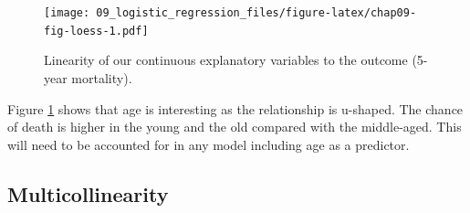 \documentclass[
  12pt,
  krantz2]{krantz}
\makeatletter
\newenvironment{Shaded}{\begin{snugshade}}{\end{snugshade}}
\newcommand{\DataTypeTok}[1]{\textcolor[rgb]{0.13,0.29,0.53}{#1}}
\newcommand{\DecValTok}[1]{\textcolor[rgb]{0.00,0.00,0.81}{#1}}
\newcommand{\FloatTok}[1]{\textcolor[rgb]{0.00,0.00,0.81}{#1}}
\newcommand{\KeywordTok}[1]{\textcolor[rgb]{0.13,0.29,0.53}{\textbf{#1}}}
\newcommand{\NormalTok}[1]{#1}
\newcommand{\OperatorTok}[1]{\textcolor[rgb]{0.81,0.36,0.00}{\textbf{#1}}}
\newcommand{\StringTok}[1]{\textcolor[rgb]{0.31,0.60,0.02}{#1}}
\newenvironment{kframe}{%
\medskip{}
\setlength{\fboxsep}{.8em}
 \def\at@end@of@kframe{}%
 \ifinner\ifhmode%
  \def\at@end@of@kframe{\end{minipage}}%
  \begin{minipage}{\columnwidth}%
 \fi\fi%
 \def\FrameCommand##1{\hskip\@totalleftmargin \hskip-\fboxsep
 \colorbox{shadecolor}{##1}\hskip-\fboxsep
     \hskip-\linewidth \hskip-\@totalleftmargin \hskip\columnwidth}%
 \MakeFramed {\advance\hsize-\width
   \@totalleftmargin\z@ \linewidth\hsize
   \@setminipage}}%
 {\par\unskip\endMakeFramed%
 \at@end@of@kframe}
\renewenvironment{Shaded}{\begin{kframe}}{\end{kframe}}
\makeatother
\begin{document}
\begin{Shaded}
\end{Shaded}

\begin{figure}
\centering
\texttt{[image: 09\_logistic\_regression\_files/figure-latex/chap09-fig-loess-1.pdf]}
\caption{\label{fig:chap09-fig-loess}Linearity of our continuous explanatory variables to the outcome (5-year mortality).}
\end{figure}

Figure \ref{fig:chap09-fig-loess} shows that age is interesting as the relationship is u-shaped.
The chance of death is higher in the young and the old compared with the middle-aged.
This will need to be accounted for in any model including age as a predictor.

\hypertarget{chap09-h2-multicollinearity}{%
\subsection{Multicollinearity}\label{chap09-h2-multicollinearity}}

\end{document}
